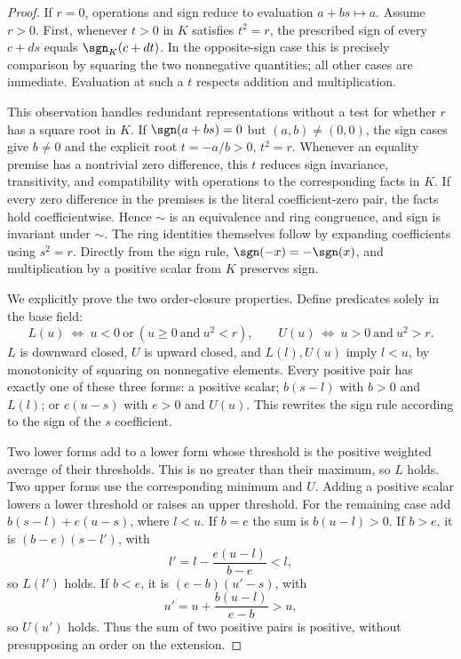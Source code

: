 \begin{proof}
If $r=0$, operations and sign reduce to evaluation $a+bs\mapsto a$.
Assume $r>0$. First, whenever $t>0$ in $K$ satisfies $t^2=r$, the
prescribed sign of every $c+ds$ equals $\sgn_K(c+dt)$. In the
opposite-sign case this is precisely comparison by squaring the
two nonnegative quantities; all other cases are immediate.
Evaluation at such a $t$ respects addition and multiplication.

This observation handles redundant representations without a test
for whether $r$ has a square root in $K$. If $\sgn(a+bs)=0$ but
$(a,b)\ne(0,0)$, the sign cases give $b\ne0$ and the explicit root
$t=-a/b>0$, $t^2=r$. Whenever an equality premise has a nontrivial
zero difference, this $t$ reduces sign invariance, transitivity,
and compatibility with operations to the corresponding facts in $K$.
If every zero difference in the premises is the literal coefficient-zero
pair, the facts hold coefficientwise. Hence $\sim$ is an equivalence
and ring congruence, and sign is invariant under $\sim$.
The ring identities themselves follow by expanding coefficients
using $s^2=r$. Directly from the sign rule,
$\sgn(-x)=-\sgn(x)$, and multiplication by a positive scalar from
$K$ preserves sign.

We explicitly prove the two order-closure properties. Define predicates
solely in the base field:
\[
 L(u)\ \Longleftrightarrow\ u<0\ \text{or}\ (u\geq0\ \text{and}\ u^2<r),
 \qquad
 U(u)\ \Longleftrightarrow\ u>0\ \text{and}\ u^2>r.
\]
$L$ is downward closed, $U$ is upward closed, and $L(l),U(u)$ imply
$l<u$, by monotonicity of squaring on nonnegative elements.
Every positive pair has exactly one of these three forms: a positive
scalar; $b(s-l)$ with $b>0$ and $L(l)$; or $e(u-s)$ with $e>0$ and
$U(u)$. This rewrites the sign rule according to the sign of the
$s$ coefficient.

Two lower forms add to a lower form whose threshold is the positive
weighted average of their thresholds. This is no greater than their
maximum, so $L$ holds. Two upper forms use the corresponding minimum
and $U$. Adding a positive scalar lowers a lower threshold or raises
an upper threshold. For the remaining case add
$b(s-l)+e(u-s)$, where $l<u$. If $b=e$ the sum is $b(u-l)>0$.
If $b>e$, it is $(b-e)(s-l')$, with
\[
 l'=l-\frac{e(u-l)}{b-e}<l,
\]
so $L(l')$ holds. If $b<e$, it is $(e-b)(u'-s)$, with
\[
 u'=u+\frac{b(u-l)}{e-b}>u,
\]
so $U(u')$ holds. Thus the sum of two positive pairs is positive,
without presupposing an order on the extension.


\end{proof}
